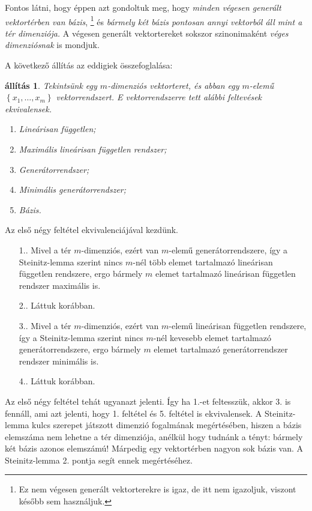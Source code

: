\documentclass[a4paper, showtrims]{memoir}
\makeatletter
\renewenvironment{proof}[1][\proofname]
    {\par\pushQED{\qed}%
    \normalfont \topsep6\p@\@plus6\p@\relax
    \trivlist
    \item[\hskip\labelsep
        \itshape
    #1\@addpunct{:}]\ignorespaces}
    {\popQED\endtrivlist\@endpefalse}
\theoremstyle{plain}
\newtheorem{proposition}{állítás}[chapter]
\theoremstyle{remark}
\theoremstyle{definition}
\makeatother
\begin{document}
Fontos látni, hogy éppen azt gondoltuk meg, hogy \emph{minden végesen generált vektortérben van bázis},
\footnote{Ez nem végesen generált vektorterekre is igaz, de itt nem igazoljuk,
	viszont később sem használjuk.}
és \emph{bármely két bázis pontosan annyi vektorból áll mint a tér dimenziója.}
A végesen generált vektortereket sokszor szinonimaként \emph{véges dimenziósnak} is mondjuk.

A következő állítás az eddigiek összefoglalása:
\begin{proposition}
	Tekintsünk egy $m$-dimenziós vektorteret, és abban egy $m$-elemű
	$\left\{ x_1,\ldots,x_m \right\}$
	vektorrendszert.
	E vektorrendszerre tett alábbi feltevések ekvivalensek.
	\begin{enumerate}
		\item Lineárisan független;
		\item Maximális lineárisan független rendszer;
		\item Generátorrendszer;
		\item Minimális generátorrendszer;
		\item Bázis.\qedhere
	\end{enumerate}
\end{proposition}
\begin{proof}
	Az első négy feltétel ekvivalenciájával kezdünk.
	\begin{itemize}
		\item[1.\Rightarrow 2.]
		      Mivel a tér $m$-dimenziós, ezért van $m$-elemű generátorrendszere,
		      így a Steinitz-lemma szerint nincs $m$-nél több elemet tartalmazó lineárisan független
		      rendszere, ergo bármely $m$ elemet tartalmazó lineárisan független rendszer maximális is.
		\item[2.\Rightarrow 3.]
		      Láttuk korábban.
		\item[3.\Rightarrow 4.]
		      Mivel a tér $m$-dimenziós, ezért van $m$-elemű lineárisan független rendszere,
		      így a Steinitz-lemma szerint nincs $m$-nél kevesebb elemet tartalmazó generátorrendszere,
		      ergo bármely $m$ elemet tartalmazó generátorrendszer rendszer minimális is.
		\item[4.\Rightarrow 1.]
		      Láttuk korábban.
	\end{itemize}

	Az első négy feltétel tehát ugyanazt jelenti.
	Így ha 1.-et feltesszük, akkor 3. is fennáll, ami azt jelenti, hogy 1. feltétel és 5. feltétel is ekvivalensek.
\end{proof}
A Steinitz-lemma kulcs szerepet játszott dimenzió fogalmának megértésében,
hiszen a bázis elemszáma nem lehetne a tér dimenziója, anélkül hogy tudnánk a tényt:
bármely két bázis azonos elemszámú!
Márpedig egy vektortérben nagyon sok bázis van.
A Steinitz-lemma 2. pontja segít ennek megértéséhez.
\end{document}
